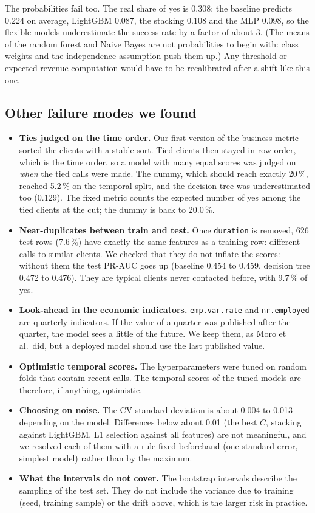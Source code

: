 \documentclass[11pt,a4paper]{article}
\begin{document}
The probabilities fail too. The real share of yes is 0.308; the baseline predicts 0.224 on average, LightGBM 0.087, the
stacking 0.108 and the MLP 0.098, so the flexible models underestimate the success rate by a factor of about 3. (The
means of the random forest and Naive Bayes are not probabilities to begin with: class weights and the independence
assumption push them up.) Any threshold or expected-revenue computation would have to be recalibrated after a shift
like this one.

\subsection{Other failure modes we found}\label{sec:ties}
\begin{itemize}
\item \textbf{Ties judged on the time order.} Our first version of the business metric sorted the clients with a
stable sort. Tied clients then stayed in row order, which is the time order, so a model with many equal scores was
judged on \emph{when} the tied calls were made. The dummy, which should reach exactly 20\,\%, reached 5.2\,\% on the
temporal split, and the decision tree was underestimated too (0.129). The fixed metric counts the expected number of
yes among the tied clients at the cut; the dummy is back to 20.0\,\%.
\item \textbf{Near-duplicates between train and test.} Once \texttt{duration} is removed, 626 test rows (7.6\,\%) have
exactly the same features as a training row: different calls to similar clients. We checked that they do not inflate
the scores: without them the test PR-AUC goes up (baseline 0.454 to 0.459, decision tree 0.472 to 0.476). They are
typical clients never contacted before, with 9.7\,\% of yes.
\item \textbf{Look-ahead in the economic indicators.} \texttt{emp.var.rate} and \texttt{nr.employed} are quarterly
indicators. If the value of a quarter was published after the quarter, the model sees a little of the future. We keep
them, as Moro et al.\ did, but a deployed model should use the last published value.
\item \textbf{Optimistic temporal scores.} The hyperparameters were tuned on random folds that contain recent calls.
The temporal scores of the tuned models are therefore, if anything, optimistic.
\item \textbf{Choosing on noise.} The CV standard deviation is about 0.004 to 0.013 depending on the model. Differences
below about 0.01 (the best $C$, stacking against LightGBM, L1 selection against all features) are not meaningful, and
we resolved each of them with a rule fixed beforehand (one standard error, simplest model) rather than by the maximum.
\item \textbf{What the intervals do not cover.} The bootstrap intervals describe the sampling of the test set. They
do not include the variance due to training (seed, training sample) or the drift above, which is the larger risk in
practice.
\end{itemize}
\end{document}
